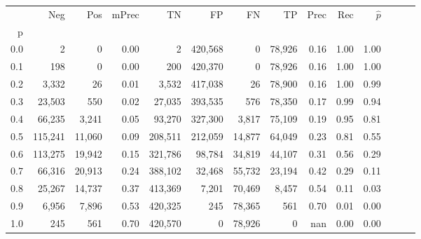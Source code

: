 \begin{tabular}{rrrrrrrrrrrrrr}
\toprule
{} &      Neg &     Pos & mPrec &       TN &       FP &      FN &      TP &  Prec &   Rec & $\hat{p}$ \\
p   &          &         &       &          &          &         &         &       &       &           \\
\midrule
0.0 &        2 &       0 &  0.00 &        2 &  420,568 &       0 &  78,926 &  0.16 &  1.00 &      1.00 \\
0.1 &      198 &       0 &  0.00 &      200 &  420,370 &       0 &  78,926 &  0.16 &  1.00 &      1.00 \\
0.2 &    3,332 &      26 &  0.01 &    3,532 &  417,038 &      26 &  78,900 &  0.16 &  1.00 &      0.99 \\
0.3 &   23,503 &     550 &  0.02 &   27,035 &  393,535 &     576 &  78,350 &  0.17 &  0.99 &      0.94 \\
0.4 &   66,235 &   3,241 &  0.05 &   93,270 &  327,300 &   3,817 &  75,109 &  0.19 &  0.95 &      0.81 \\
0.5 &  115,241 &  11,060 &  0.09 &  208,511 &  212,059 &  14,877 &  64,049 &  0.23 &  0.81 &      0.55 \\
0.6 &  113,275 &  19,942 &  0.15 &  321,786 &   98,784 &  34,819 &  44,107 &  0.31 &  0.56 &      0.29 \\
0.7 &   66,316 &  20,913 &  0.24 &  388,102 &   32,468 &  55,732 &  23,194 &  0.42 &  0.29 &      0.11 \\
0.8 &   25,267 &  14,737 &  0.37 &  413,369 &    7,201 &  70,469 &   8,457 &  0.54 &  0.11 &      0.03 \\
0.9 &    6,956 &   7,896 &  0.53 &  420,325 &      245 &  78,365 &     561 &  0.70 &  0.01 &      0.00 \\
1.0 &      245 &     561 &  0.70 &  420,570 &        0 &  78,926 &       0 &   nan &  0.00 &      0.00 \\
\bottomrule
\end{tabular}
